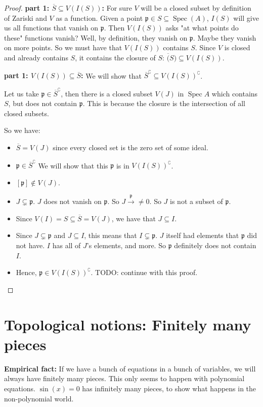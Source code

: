 \documentclass{book}
\newcommand{\Spec}{\operatorname{Spec}}
\newcommand{\spec}{\operatorname{Spec}}
\newcommand{\p}{\mathfrak{p}}
\theoremstyle{definition}
\begin{document}
\begin{proof}
\textbf{part 1: $\overline{S} \subseteq V(I(S))$:}
For sure $V$ will be a closed subset by definition of Zariski and $V$ as a function.
Given a point $\p \in S \subseteq \Spec(A)$, $I(S)$ will give us all
functions that vanish on $\p$. Then $V(I(S))$ asks "at what points do these"
functions vanish? Well, by definition, they vanish on $\p$. Maybe they vanish on
more points. So we must have that $V(I(S))$ contains $S$.
Since $V$ is closed and already contains $S$, it contains the
closure of $S$: $\overline(S) \subseteq V(I(S))$.

\textbf{part 1: $V(I(S)) \subseteq \overline{S}$:}
We will show that $\overline{S}^\complement \subseteq V(I(S))^\complement$.

Let us take $\p \in \overline{S}^\complement$, then there is a closed
subset $V(J)$ in $\spec A$ which contains $S$, but does not contain $\p$. This is
because the closure is the intersection of all closed subsets.


So we have:

\begin{itemize}
\item $\overline{S} = V(J)$ since every closed set is the zero set of some ideal.
\item $\p \in \overline{S}^\complement$ We will show that this $\p$ is in $V(I(S))^\complement$.
\item $[\p] \not \in V(J)$.
\item $J \subsetneq \p$. $J$ does not vanish on $\p$. So $J \xrightarrow{\p} \neq 0$. So $J$ 
  is not a subset of $\p$.
\item Since $V(I) = S \subseteq \overline{S} = V(J)$, we have that $J \subseteq I$.
\item Since $J \subsetneq \p$ and $J \subseteq I$, this means that $I \subsetneq \p$.
   $J$ itself had elements that $\p$ did not have. $I$ has all of $J$'s elements,
   and more. So $\p$ definitely does not contain $I$.
\item Hence, $\p \in V(I(S))^\complement$. TODO: continue with this proof.
\end{itemize}
\end{proof}

\section{Topological notions: Finitely many pieces}

\textbf{Empirical fact:}
If we have a bunch of equations in a bunch of variables, we will always have
finitely many pieces. This only seems to happen with polynomial equations.
$\sin(x) = 0$ has infinitely many pieces, to show what happens in the non-polynomial
world.
\end{document}
